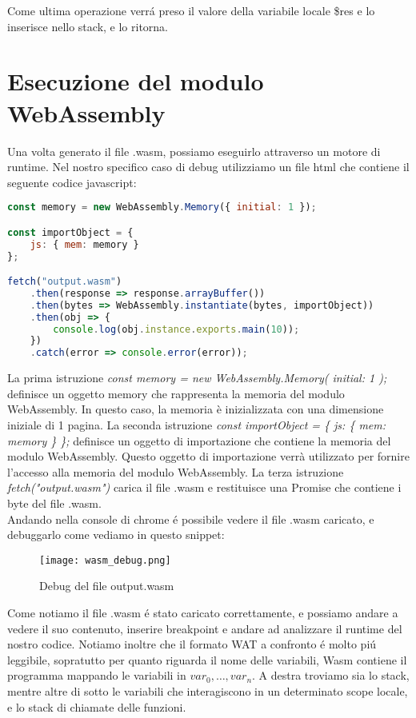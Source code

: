 \documentclass[../../main.tex]{subfiles}
\begin{document}
Come ultima operazione verrá preso il valore della variabile locale \$res e lo inserisce nello stack, e lo ritorna.

\section{Esecuzione del modulo WebAssembly}
Una volta generato il file .wasm, possiamo eseguirlo attraverso un motore di runtime. Nel nostro specifico caso di debug utilizziamo un file html che contiene il seguente codice javascript:
\begin{lstlisting}[language=Javascript, caption={Esecuzione del modulo WebAssembly}, label={lst:esecuzioneWasm}]
const memory = new WebAssembly.Memory({ initial: 1 });

const importObject = {
    js: { mem: memory }
};

fetch("output.wasm")
    .then(response => response.arrayBuffer())
    .then(bytes => WebAssembly.instantiate(bytes, importObject))
    .then(obj => {
        console.log(obj.instance.exports.main(10));
    })
    .catch(error => console.error(error));

\end{lstlisting}

La prima istruzione \textit{const memory = new WebAssembly.Memory({ initial: 1 });} definisce un oggetto memory che rappresenta la memoria del modulo WebAssembly. In questo caso, la memoria è inizializzata con una dimensione iniziale di 1 pagina.
La seconda istruzione \textit{const importObject = \{ js: \{ mem: memory \} \};} definisce un oggetto di importazione che contiene la memoria del modulo WebAssembly. Questo oggetto di importazione verrà utilizzato per fornire l'accesso alla memoria del modulo WebAssembly.
La terza istruzione \textit{fetch("output.wasm")} carica il file .wasm e restituisce una Promise che contiene i byte del file .wasm.\\
Andando nella console di chrome é possibile vedere il file .wasm caricato, e debuggarlo come vediamo in questo snippet:
\begin{figure}[H]
    \centering
    \texttt{[image: wasm\_debug.png]}
    \caption{Debug del file output.wasm}
    \label{fig:wasm_debug}
\end{figure}
Come notiamo il file .wasm é stato caricato correttamente, e possiamo andare a vedere il suo contenuto, inserire breakpoint e andare ad analizzare il runtime del nostro codice.
Notiamo inoltre che il formato WAT a confronto é molto piú leggibile, sopratutto per quanto riguarda il nome delle variabili, Wasm contiene il programma mappando le variabili in $var_0,\dots, var_n$.
A destra troviamo sia lo stack, mentre altre di sotto le variabili che interagiscono in un determinato scope locale, e lo stack di chiamate delle funzioni.
\end{document}
